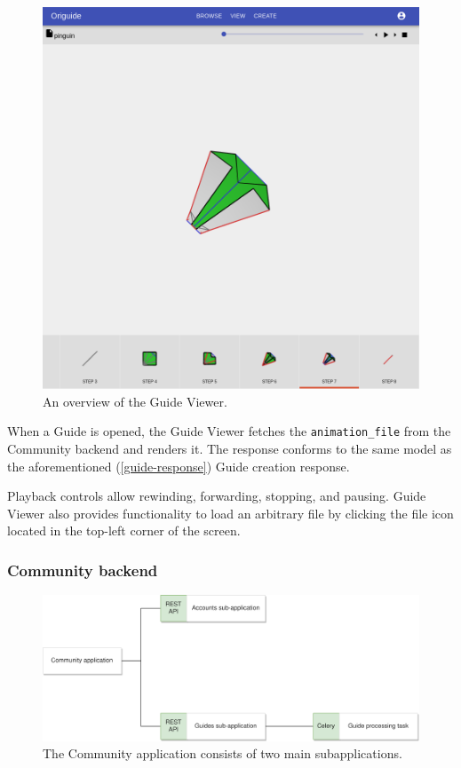 \begin{figure}[H]
  \caption{An overview of the Guide Viewer.}
  \label{3-guide-viewer}
  \centering
    \includegraphics[width=\textwidth]{assets/3-guide-viewer.png}
\end{figure}

When a Guide is opened, the Guide Viewer fetches the \texttt{animation\_file} from the Community backend and renders it.
The response conforms to the same model as the aforementioned (\ref{guide-response}) Guide creation response.

\medskip
Playback controls allow rewinding, forwarding, stopping, and pausing. Guide Viewer also provides functionality to load an arbitrary  file by clicking the file icon located in the top-left corner of the screen.


\subsubsection{Community backend}

\begin{figure}[H]
  \caption{The Community application consists of two main subapplications.}
  \label{3-backend-community-components}
  \centering
    \includegraphics[width=\textwidth]{assets/3-community-application.png}
\end{figure}

